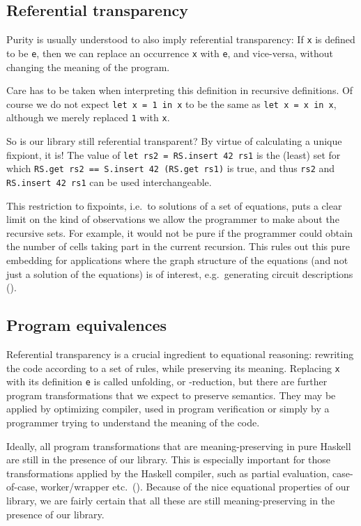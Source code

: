\documentclass[manuscript,screen,acmsmall]{acmart}
\begin{document}
\subsection{Referential transparency}

Purity is usually understood to also imply referential transparency: If \verb|x| is defined to be \verb|e|, then we can replace an occurrence \verb|x| with \verb|e|, and vice-versa, without changing the meaning of the program.

Care has to be taken when interpreting this definition in recursive definitions. Of course we do not expect \verb|let x = 1 in x| to be the same as \verb|let x = x in x|, although we merely replaced \verb|1| with \verb|x|.

So is our library still referential transparent? By virtue of calculating a unique fixpiont, it is!  The value of \verb|let rs2 = RS.insert 42 rs1| is the (least) set for which \verb|RS.get rs2 == S.insert 42 (RS.get rs1)| is true, and thus \verb|rs2| and \verb|RS.insert 42 rs1| can be used interchangeable.

This restriction to fixpoints, i.e.\ to solutions of a set of equations, puts a clear limit on the kind of observations we allow the programmer to make about the recursive sets. For example, it would not be pure if the programmer could obtain the number of cells taking part in the current recursion. This rules out this pure embedding for applications where the graph structure of the equations (and not just a solution of the equations) is of interest, e.g.\ generating circuit descriptions (\cite{circuits}).

\subsection{Program equivalences}

Referential transparency is a crucial ingredient to equational reasoning: rewriting the code according to a set of rules, while preserving its meaning. Replacing \verb|x| with its definition \verb|e| is called unfolding, or \textdelta-reduction, but there are further program transformations that we expect to preserve semantics.  They may be applied by optimizing compiler, used in program verification or simply by a programmer trying to understand the meaning of the code.

Ideally, all program transformations that are meaning-preserving in pure Haskell are still in the presence of our library. This is especially important for those transformations applied by the Haskell compiler, such as partial evaluation, case-of-case, worker/wrapper etc.\ (\cite{optimiser}). Because of the nice equational properties of our library, we are fairly certain that all these are still meaning-preserving in the presence of our library.
\end{document}
